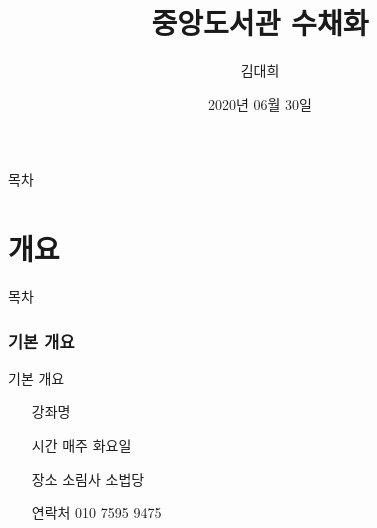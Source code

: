 \documentclass[aspectratio=1610,17pt,xcolor=pdftex,dvipsnames,table,handout]{beamer}
\begin{document}
	

			\title{중앙도서관 수채화}

			\author{김대희}

			\date{2020년 06월 30일}




		\begin{frame}[plain]
		\titlepage
		\end{frame}



		\begin{frame} {목차}
		\tableofcontents
		\end{frame}
		

		\part{개요}
		\frame{\partpage}


		\begin{frame} [plain]{목차}
		\tableofcontents
		\end{frame}
		

		
				
		
		\section{기본 개요}
		

		\begin{frame} [t,plain]
			\begin{block} {기본 개요}

			\setlength{\leftmargini}{5em}			
			\begin{itemize}
				\item [강좌명]  
				\item [시간]  매주 화요일
				\item [장소]  소림사 소법당
				\item [연락처]  010 7595 9475
			\end{itemize}
			
			\end{block}
		\end{frame}
		
\end{document}
